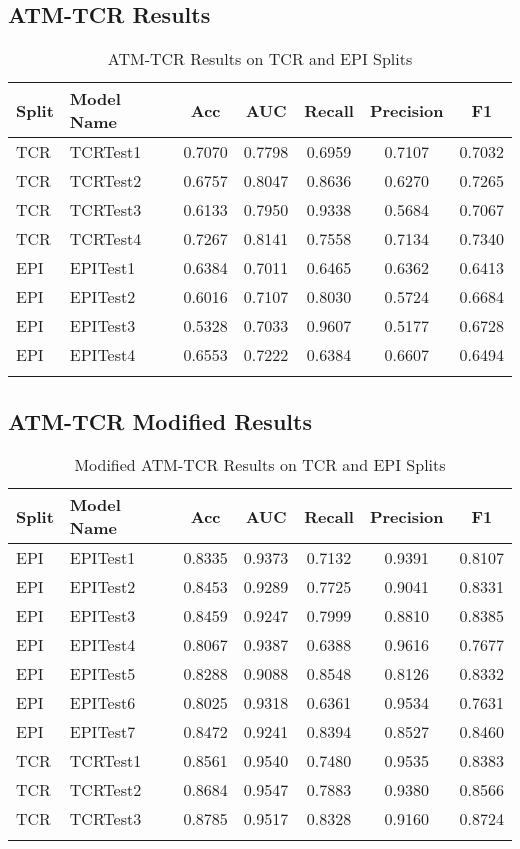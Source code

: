 \documentclass[11pt,a4paper]{article}
\begin{document}
\subsection{ATM-TCR Results}
\begin{longtable}{|l|l|c|c|c|c|c|}
\hline
\textbf{Split} & \textbf{Model Name} & \textbf{Acc} & \textbf{AUC} & \textbf{Recall} & \textbf{Precision} & \textbf{F1} \\ \hline
TCR & TCRTest1 & 0.7070 & 0.7798 & 0.6959 & 0.7107 & 0.7032 \\ \hline
TCR & TCRTest2 & 0.6757 & 0.8047 & 0.8636 & 0.6270 & 0.7265 \\ \hline
TCR & TCRTest3 & 0.6133 & 0.7950 & 0.9338 & 0.5684 & 0.7067 \\ \hline
TCR & TCRTest4 & 0.7267 & 0.8141 & 0.7558 & 0.7134 & 0.7340 \\ \hline
EPI & EPITest1 & 0.6384 & 0.7011 & 0.6465 & 0.6362 & 0.6413 \\ \hline
EPI & EPITest2 & 0.6016 & 0.7107 & 0.8030 & 0.5724 & 0.6684 \\ \hline
EPI & EPITest3 & 0.5328 & 0.7033 & 0.9607 & 0.5177 & 0.6728 \\ \hline
EPI & EPITest4 & 0.6553 & 0.7222 & 0.6384 & 0.6607 & 0.6494 \\ \hline
\caption{ATM-TCR Results on TCR and EPI Splits}
\label{table:atm-tcr}
\end{longtable}

\subsection{ATM-TCR Modified Results}
\begin{longtable}{|l|l|c|c|c|c|c|}
\hline
\textbf{Split} & \textbf{Model Name} & \textbf{Acc} & \textbf{AUC} & \textbf{Recall} & \textbf{Precision} & \textbf{F1} \\ \hline
EPI & EPITest1 & 0.8335 & 0.9373 & 0.7132 & 0.9391 & 0.8107 \\ \hline
EPI & EPITest2 & 0.8453 & 0.9289 & 0.7725 & 0.9041 & 0.8331 \\ \hline
EPI & EPITest3 & 0.8459 & 0.9247 & 0.7999 & 0.8810 & 0.8385 \\ \hline
EPI & EPITest4 & 0.8067 & 0.9387 & 0.6388 & 0.9616 & 0.7677 \\ \hline
EPI & EPITest5 & 0.8288 & 0.9088 & 0.8548 & 0.8126 & 0.8332 \\ \hline
EPI & EPITest6 & 0.8025 & 0.9318 & 0.6361 & 0.9534 & 0.7631 \\ \hline
EPI & EPITest7 & 0.8472 & 0.9241 & 0.8394 & 0.8527 & 0.8460 \\ \hline
TCR & TCRTest1 & 0.8561 & 0.9540 & 0.7480 & 0.9535 & 0.8383 \\ \hline
TCR & TCRTest2 & 0.8684 & 0.9547 & 0.7883 & 0.9380 & 0.8566 \\ \hline
TCR & TCRTest3 & 0.8785 & 0.9517 & 0.8328 & 0.9160 & 0.8724 \\ \hline
\caption{Modified ATM-TCR Results on TCR and EPI Splits}
\label{table:atm-tcr}
\end{longtable}
\end{document}
